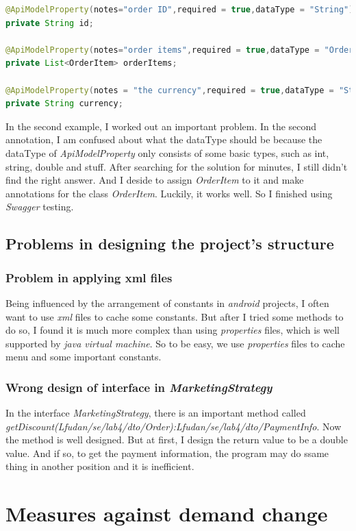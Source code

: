 \documentclass[a4paper]{report}
\begin{document}
\begin{lstlisting}[language=java]
@ApiModelProperty(notes="order ID",required = true,dataType = "String")
private String id;

@ApiModelProperty(notes="order items",required = true,dataType = "OrderItem")
private List<OrderItem> orderItems;

@ApiModelProperty(notes = "the currency",required = true,dataType = "String")
private String currency;
\end{lstlisting}
\par In the second example, I worked out an important problem. In the second annotation, I am confused about what the dataType should be because the dataType of \emph{ApiModelProperty} only consists of some basic types, such as int, string, double and stuff. After searching for the solution for minutes, I still didn't find the right answer. And I deside to assign \emph{OrderItem} to it and make annotations for the class \emph{OrderItem}. Luckily, it works well. So I finished using \emph{Swagger} testing.
\section{Problems in designing the project's structure}
\subsection{Problem in applying xml files}
\par Being influenced by the arrangement of constants in \emph{android} projects, I often want to use \emph{xml} files to cache some constants. But after I tried some methods to do so, I found it is much more complex than using \emph{properties} files, which is well supported by \emph{java virtual machine}. So to be easy, we use \emph{properties} files to cache menu and some important constants.
\subsection{Wrong design of interface in \emph{MarketingStrategy}}
\par In the interface \emph{MarketingStrategy}, there is an important method called \emph{getDiscount(Lfudan/se/lab4/dto/Order):Lfudan/se/lab4/dto/PaymentInfo}. Now the method is well designed. But at first, I design the return value to be a double value. And if so, to get the payment information, the program may do ssame thing in another position and it is inefficient.
\chapter{Measures against demand change}
\end{document}
